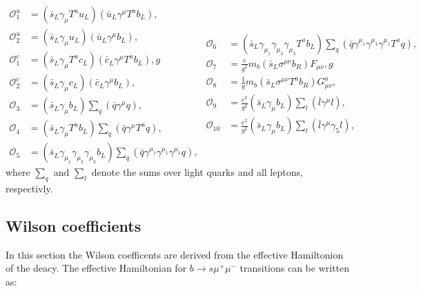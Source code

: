\documentclass[english]{uzhpub}
\begin{document}
 \begin{equation}
  \begin{split}
   \mathcal{O}_1^u &= (\bar{s}_L \gamma_\mu T^a u_L)(\bar{u}_L \gamma^\mu T^a b_L),  \\
   \mathcal{O}_2^u &= (\bar{s}_L \gamma_\mu u_L) (\bar{u}_L \gamma^\mu b_L),  \\
   \mathcal{O}_1^c &= (\bar{s}_L \gamma_\mu T^a c_L) (\bar{c}_L \gamma^\mu T^a b_L), g \\
   \mathcal{O}_2^c &= (\bar{s}_L \gamma_\mu c_L) (\bar{c}_L \gamma^\mu b_L),  \\
   \mathcal{O}_3 &= (\bar{s}_L \gamma_\mu b_L) \sum_q (\bar{q} \gamma^\mu q),  \\
   \mathcal{O}_4 &= (\bar{s}_L \gamma_\mu T^a b_L) \sum_q (\bar{q} \gamma^\mu T^a q),  \\
   \mathcal{O}_5 &= (\bar{s}_L \gamma_{\mu_1} \gamma_{\mu_2} \gamma_{\mu_3} b_L ) \sum_q (\bar{q} \gamma^{\mu_1} \gamma^{\mu_1} \gamma^{\mu_1} q),
  \end{split}
  \begin{split}
   \mathcal{O}_6 &= (\bar{s}_L \gamma_{\mu_1} \gamma_{\mu_2} \gamma_{\mu_3} T^a b_L) \sum_q (\bar{q} \gamma^{\mu_1} \gamma^{\mu_1} \gamma^{\mu_1} T^a q), \\
   \mathcal{O}_7 &= \frac{e}{g^2} m_b (\bar{s}_L \sigma^{\mu \nu} b_R) F_{\mu \nu},g \\
   \mathcal{O}_8 &= \frac{1}{g} m_b (\bar{s}_L \sigma^{\mu \nu} T^a b_R) G_{\mu \nu}^a,  \\
   \mathcal{O}_9 &= \frac{e^2}{g^2} (\bar{s}_L \gamma_\mu b_L) \sum_l (\bar{l} \gamma^\mu l),  \\
   \mathcal{O}_{10} &= \frac{e^2}{g^2} (\bar{s}_L \gamma_\mu b_L) \sum_l (\bar{l} \gamma^\mu \gamma_5 l),
  \end{split}
  \label{eq:P}
 \end{equation}
 where $\sum_q$ and $\sum_l$ denote the sums over light quarks and all leptons, respectivly.




 \subsection{Wilson coefficients}
 In this section the Wilson coefficents are derived from the effective Hamiltonion of the deacy.
 The effective Hamiltonian for $b \rightarrow s \mu^+ \mu^- $ transitions can be written as:
\end{document}
